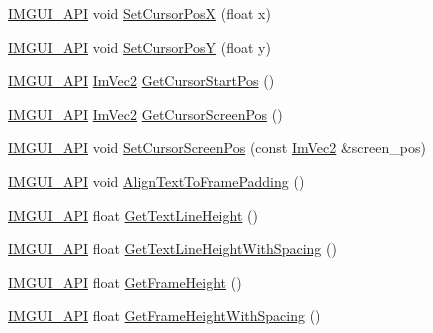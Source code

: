 \begin{DoxyCompactItemize}
\item 
\mbox{\hyperlink{imgui_8h_a43829975e84e45d1149597467a14bbf5}{I\+M\+G\+U\+I\+\_\+\+A\+PI}} void \mbox{\hyperlink{namespace_im_gui_a8f56616f8d0b35e6e756c0b7f198ac0f}{Set\+Cursor\+PosX}} (float x)
\item 
\mbox{\hyperlink{imgui_8h_a43829975e84e45d1149597467a14bbf5}{I\+M\+G\+U\+I\+\_\+\+A\+PI}} void \mbox{\hyperlink{namespace_im_gui_a0174d351957d5c5677ebc214dd54f499}{Set\+Cursor\+PosY}} (float y)
\item 
\mbox{\hyperlink{imgui_8h_a43829975e84e45d1149597467a14bbf5}{I\+M\+G\+U\+I\+\_\+\+A\+PI}} \mbox{\hyperlink{struct_im_vec2}{Im\+Vec2}} \mbox{\hyperlink{namespace_im_gui_a8ee9647de3b39fc7b77395082fc9e0cc}{Get\+Cursor\+Start\+Pos}} ()
\item 
\mbox{\hyperlink{imgui_8h_a43829975e84e45d1149597467a14bbf5}{I\+M\+G\+U\+I\+\_\+\+A\+PI}} \mbox{\hyperlink{struct_im_vec2}{Im\+Vec2}} \mbox{\hyperlink{namespace_im_gui_adb0db3c1ee36f5085f35890a4229ae75}{Get\+Cursor\+Screen\+Pos}} ()
\item 
\mbox{\hyperlink{imgui_8h_a43829975e84e45d1149597467a14bbf5}{I\+M\+G\+U\+I\+\_\+\+A\+PI}} void \mbox{\hyperlink{namespace_im_gui_ab2f9a9014436bad2eadb8b01a42f6817}{Set\+Cursor\+Screen\+Pos}} (const \mbox{\hyperlink{struct_im_vec2}{Im\+Vec2}} \&screen\+\_\+pos)
\item 
\mbox{\hyperlink{imgui_8h_a43829975e84e45d1149597467a14bbf5}{I\+M\+G\+U\+I\+\_\+\+A\+PI}} void \mbox{\hyperlink{namespace_im_gui_ae14be3a3bec106de7c91aaa2a9a558a1}{Align\+Text\+To\+Frame\+Padding}} ()
\item 
\mbox{\hyperlink{imgui_8h_a43829975e84e45d1149597467a14bbf5}{I\+M\+G\+U\+I\+\_\+\+A\+PI}} float \mbox{\hyperlink{namespace_im_gui_aaba5637199d31ea23d4d143b30a44aff}{Get\+Text\+Line\+Height}} ()
\item 
\mbox{\hyperlink{imgui_8h_a43829975e84e45d1149597467a14bbf5}{I\+M\+G\+U\+I\+\_\+\+A\+PI}} float \mbox{\hyperlink{namespace_im_gui_aa1616f6082fd210fde8d98c511bf8f56}{Get\+Text\+Line\+Height\+With\+Spacing}} ()
\item 
\mbox{\hyperlink{imgui_8h_a43829975e84e45d1149597467a14bbf5}{I\+M\+G\+U\+I\+\_\+\+A\+PI}} float \mbox{\hyperlink{namespace_im_gui_ae560f17cf3262017cee888d1eb77f294}{Get\+Frame\+Height}} ()
\item 
\mbox{\hyperlink{imgui_8h_a43829975e84e45d1149597467a14bbf5}{I\+M\+G\+U\+I\+\_\+\+A\+PI}} float \mbox{\hyperlink{namespace_im_gui_a8de260eebd333718fa0c3b6c80258c67}{Get\+Frame\+Height\+With\+Spacing}} ()
\item 

\end{DoxyCompactItemize}
